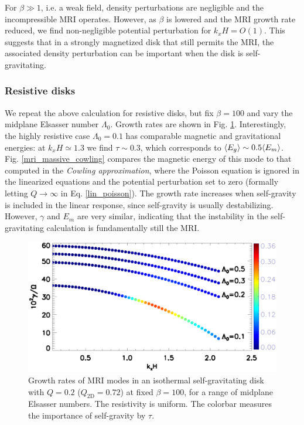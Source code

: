 For $\beta\gg 1$, i.e. a weak field, density perturbations are
negligible and the incompressible MRI operates. However, as $\beta$ is
lowered and the MRI growth rate reduced, we find non-negligible
potential perturbation for $k_xH=O(1)$. This suggests that in a
strongly magnetized disk that still permits the MRI, the associated
density perturbation can be important when the disk is
self-gravitating. %



\subsubsection{Resistive disks}
We repeat the above calculation for resistive disks, but fix
$\beta=100$ and vary the midplane Elsasser number $\Lambda_0$. Growth
rates are shown in Fig. \ref{gravity_energy_resis}. 
Interestingly, the highly resistive case $\Lambda_0=0.1$ has
comparable magnetic and gravitational energies: at $k_xH\simeq1.3$ we
find $\tau\sim 0.3$, which corresponds to $\langle{E_g}\rangle\sim 0.5\langle{E_m}\rangle$.  
Fig. \ref{mri_massive_cowling} compares the magnetic
energy of this mode to that computed in the \emph{Cowling  
  approximation}, where the Poisson equation is ignored in the 
linearized equations and the potential perturbation set to zero  
(formally letting $Q\to\infty$ in Eq. \ref{lin_poisson}).  
The growth rate increases when self-gravity is included in the linear
response, since self-gravity is usually destabilizing. However, 
$\gamma$ and $E_m$ are very similar, indicating that the instability
in the self-gravitating calculation is fundamentally still the MRI.   

\begin{figure}
  \includegraphics[width=\linewidth]{figures/compare_energy_resis}
  \caption{
    Growth rates of MRI modes in an isothermal self-gravitating
    disk with $Q=0.2$ ($Q_\mathrm{2D}=0.72$) at fixed $\beta=100$, 
    for a range of midplane Elsasser numbers. The resistivity is
    uniform. The colorbar measures the importance of self-gravity by $\tau$. 
    \label{gravity_energy_resis}}
\end{figure}


